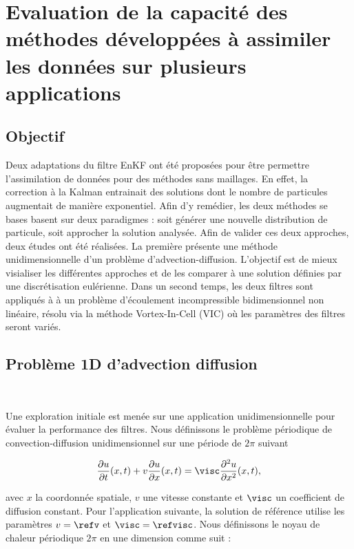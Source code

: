 \chapter{Evaluation de la capacité des méthodes développées à assimiler les données sur plusieurs applications}

\section{Objectif}

Deux adaptations du filtre EnKF ont été proposées pour être permettre l'assimilation de données pour des méthodes sans maillages. En effet, la correction à la Kalman entrainait des solutions dont le nombre de particules augmentait de manière exponentiel. Afin d'y remédier, les deux méthodes se bases  basent sur deux paradigmes : soit générer une nouvelle distribution de particule, soit approcher la solution analysée. Afin de valider ces deux approches, deux études ont été réalisées. La première présente une méthode unidimensionnelle d'un problème d'advection-diffusion. L'objectif est de mieux visialiser les différentes approches et de les comparer à une solution définies par une discrétisation eulérienne. Dans un second temps, les deux filtres sont appliqués à à un problème d'écoulement incompressible bidimensionnel non linéaire, résolu via la méthode Vortex-In-Cell (VIC) où les paramètres des filtres seront variés.

\section{Problème 1D d'advection diffusion}~\label{sec:App_1D}

Une exploration initiale est menée sur une application unidimensionnelle pour évaluer la performance des filtres. Nous définissons le problème périodique de convection-diffusion unidimensionnel sur une période de $2\pi$ suivant

\begin{equation*}
    \frac{\partial u}{\partial t}(x,t) + v \frac{\partial u}{\partial x}(x,t) = \visc \frac{\partial^2 u}{\partial x^2}(x,t),
\end{equation*}

avec $x$ la coordonnée spatiale, $v$ une vitesse constante et $\visc$ un coefficient de diffusion constant.
Pour l'application suivante, la solution de référence utilise les paramètres $v = \refv$ et $\visc = \refvisc$.
Nous définissons le noyau de chaleur périodique $2\pi$ en une dimension comme suit :

